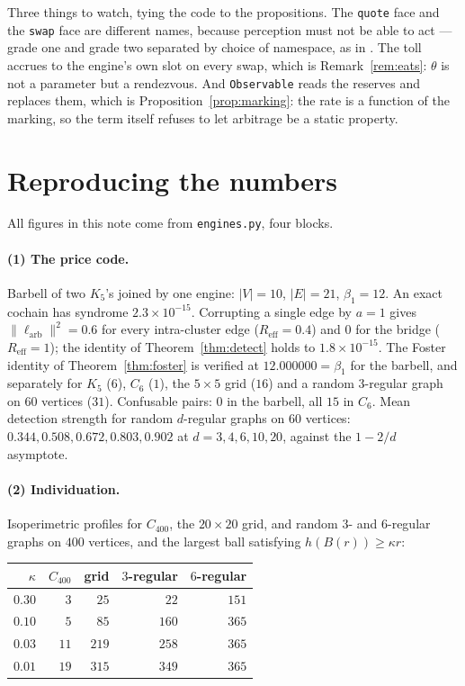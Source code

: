 \documentclass[11pt]{article}
\theoremstyle{plain}
\theoremstyle{definition}
\theoremstyle{remark}
\newcommand{\Reff}{R_{\mathrm{eff}}}
\newcommand{\bt}{\beta_1}
\begin{document}
Three things to watch, tying the code to the propositions. The
\texttt{quote} face and the \texttt{swap} face are different names, because
perception must not be able to act --- grade one and grade two separated by
choice of namespace, as in \cite[\S4.3]{game}. The toll accrues to the
engine's own slot on every swap, which is Remark~\ref{rem:eats}: $\theta$ is
not a parameter but a rendezvous. And \texttt{Observable} reads the
reserves and replaces them, which is Proposition~\ref{prop:marking}: the
rate is a function of the marking, so the term itself refuses to let
arbitrage be a static property.

\section{Reproducing the numbers}
\label{app:repro}

All figures in this note come from \texttt{engines.py}, four blocks.

\paragraph{(1) The price code.} Barbell of two $K_5$'s joined by one
engine: $|V| = 10$, $|E| = 21$, $\bt = 12$. An exact cochain has syndrome
$2.3 \times 10^{-15}$. Corrupting a single edge by $a = 1$ gives
$\|\ell_{\mathrm{arb}}\|^2 = 0.6$ for every intra-cluster edge
($\Reff = 0.4$) and $0$ for the bridge ($\Reff = 1$); the identity of
Theorem~\ref{thm:detect} holds to $1.8\times10^{-15}$. The Foster identity
of Theorem~\ref{thm:foster} is verified at $12.000000 = \bt$ for the
barbell, and separately for $K_5$ ($6$), $C_6$ ($1$), the $5\times5$ grid
($16$) and a random $3$-regular graph on $60$ vertices ($31$). Confusable
pairs: $0$ in the barbell, all $15$ in $C_6$. Mean detection strength for
random $d$-regular graphs on $60$ vertices: $0.344, 0.508, 0.672, 0.803,
0.902$ at $d = 3,4,6,10,20$, against the $1-2/d$ asymptote.

\paragraph{(2) Individuation.} Isoperimetric profiles for $C_{400}$, the
$20\times20$ grid, and random $3$- and $6$-regular graphs on $400$
vertices, and the largest ball satisfying $h(B(r)) \geq \kappa r$:

\begin{center}\small
\begin{tabular}{@{}rrrrr@{}}
\toprule
$\kappa$ & $C_{400}$ & grid & $3$-regular & $6$-regular \\
\midrule
$0.30$ & $3$  & $25$  & $22$  & $151$ \\
$0.10$ & $5$  & $85$  & $160$ & $365$ \\
$0.03$ & $11$ & $219$ & $258$ & $365$ \\
$0.01$ & $19$ & $315$ & $349$ & $365$ \\
\bottomrule
\end{tabular}
\end{center}
\end{document}

